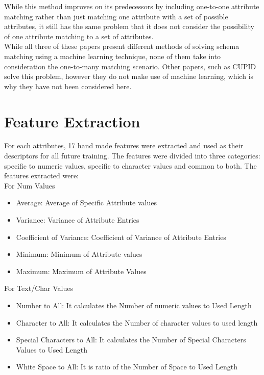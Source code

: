 \documentclass[conference]{IEEEtran}
\begin{document}
While this method improves on its predecessors by including one-to-one attribute matching rather
than just matching one attribute with a set of possible attributes, it still has the same problem that it
does not consider the possibility of one attribute matching to a set of attributes.\\

\noindent
While all three of these papers present different methods of solving schema matching using a machine learning technique, none of them take into consideration the one-to-many matching scenario. Other papers, such as CUPID solve this problem, however they do not make use of machine learning, which is why they have not been considered here.

\section{Feature Extraction}
For each attributes, 17 hand made features were extracted and used as their descriptors for all future training. The features were divided into three categories: specific to numeric values, specific to character values and common to both. The features extracted were:\\

For Num Values
\begin{itemize}
\item Average: Average of Specific Attribute values
\item Variance: Variance of Attribute Entries
\item Coefficient of Variance: Coefficient of Variance of Attribute Entries
\item Minimum: Minimum of Attribute values
\item Maximum: Maximum of Attribute Values
\end{itemize}

For Text/Char Values
\begin{itemize}
\item Number to All: It calculates the Number of numeric values to Used Length
\item Character to All: It calculates the Number of character values to used length
\item Special Characters to All: It calculates the Number of Special Characters Values to Used Length
\item White Space to All: It is ratio of the Number of Space to Used  Length
\end{itemize}
\end{document}
